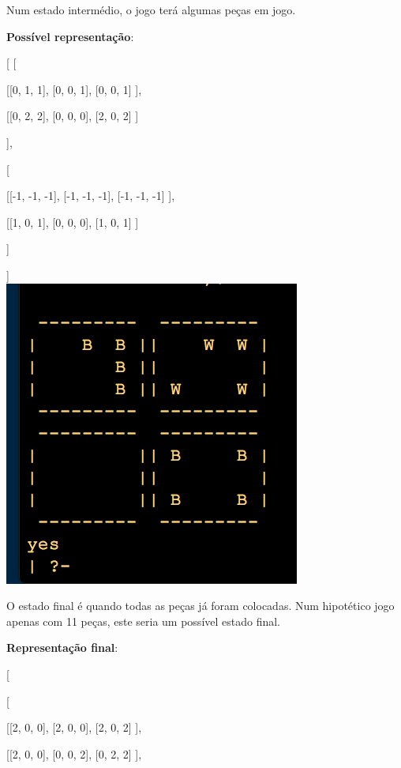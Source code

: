 \documentclass[a4paper]{article}
\begin{document}
Num estado intermédio, o jogo terá algumas peças em jogo.

\textbf{Possível representação}:

	[
		[

		 [[0, 1, 1],
		  [0, 0, 1],
		  [0, 0, 1]
		 ],

		 [[0, 2, 2],
		  [0, 0, 0],
		  [2, 0, 2]
		 ]

		],


		[

		 [[-1, -1, -1],
		  [-1, -1, -1],
		  [-1, -1, -1]
		 ],

		 [[1, 0, 1],
		  [0, 0, 0],
		  [1, 0, 1]
		 ]

		]
		
	]\linebreak\linebreak\\

\includegraphics[scale=0.8]{../printscreens/intermediate_board.png} \linebreak

O estado final é quando todas as peças já foram colocadas. Num hipotético jogo apenas com 11 peças, este seria um possível estado final.

\textbf{Representação final}:

[


		[

		 [[2, 0, 0],
		  [2, 0, 0],
		  [2, 0, 2]
		 ],

		 [[2, 0, 0],
		  [0, 0, 2],
		  [0, 2, 2]
		 ],
\end{document}
